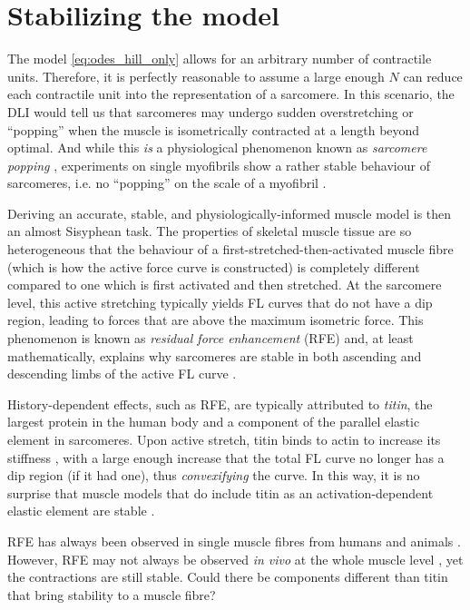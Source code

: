 \documentclass{sfuthesis}
\numberwithin{equation}{section}
\numberwithin{figure}{chapter}
\numberwithin{table}{chapter}
\theoremstyle{definition}
\begin{document}
\section{Stabilizing the model}

The model \eqref{eq:odes_hill_only} allows for an arbitrary number of contractile units. Therefore, it is perfectly reasonable to assume a large enough $N$ can reduce each contractile unit into the representation of a sarcomere. In this scenario, the DLI would tell us that sarcomeres may undergo sudden overstretching or ``popping'' when the muscle is isometrically contracted at a length beyond optimal. And while this \textit{is} a physiological phenomenon known as \textit{sarcomere popping} \cite{Morgan1990,MorganProske2004,MorganProske2006}, experiments on single myofibrils show a rather stable behaviour of sarcomeres, i.e. no ``popping'' on the scale of a myofibril \cite{JohnstonJinhaHerzog2016}.

Deriving an accurate, stable, and physiologically-informed muscle model is then an almost Sisyphean task. The properties of skeletal muscle tissue are so heterogeneous that the behaviour of a first-stretched-then-activated muscle fibre (which is how the active force curve is constructed) is completely different compared to one which is first activated and then stretched. At the sarcomere level, this active stretching typically yields FL curves that do not have a dip region, leading to forces that are above the maximum isometric force. This phenomenon is known as \textit{residual force enhancement} (RFE) and, at least mathematically, explains why sarcomeres are stable in both ascending and descending limbs of the active FL curve \cite{JoumaaLeonardHerzog2008}. 

History-dependent effects, such as RFE, are typically attributed to \textit{titin}, the largest protein in the human body and a component of the parallel elastic element in sarcomeres. Upon active stretch, titin binds to actin to increase its stiffness \cite{Nishikawa2020}, with a large enough increase that the total FL curve no longer has a dip region (if it had one), thus \textit{convexifying} the curve. In this way, it is no surprise that muscle models that do include titin as an activation-dependent elastic element are stable \cite{HeidlaufEtAl2016,HeidlaufEtAl2017,LemosEtAl2001,Millard2024,SampaioDeOliveiraUchida2025}. 

RFE has always been observed in single muscle fibres from humans and animals \cite{JoumaaLeonardHerzog2008, Pinnell2019,RassierPavlov2012}. However, RFE may not always be observed \textit{in vivo} at the whole muscle level \cite{Bakenecker2020,Chapman2018,Hinks2024}, yet the contractions are still stable. Could there be components different than titin that bring stability to a muscle fibre?
\end{document}

